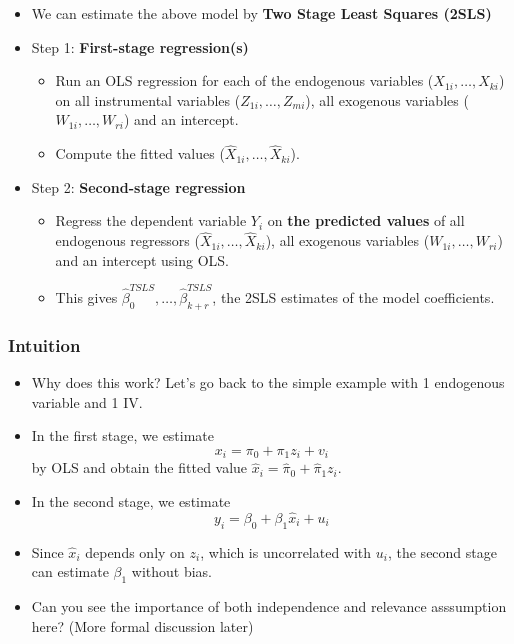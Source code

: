 \documentclass[]{book}
\providecommand{\tightlist}{%
  \setlength{\itemsep}{0pt}\setlength{\parskip}{0pt}}
\begin{document}
\begin{itemize}
\tightlist
\item
  We can estimate the above model by \textbf{Two Stage Least Squares
  (2SLS)}
\item
  Step 1: \textbf{First-stage regression(s)}

  \begin{itemize}
  \tightlist
  \item
    Run an OLS regression for each of the endogenous variables
    (\(X_{1i},\dots,X_{ki}\)) on all instrumental variables
    (\(Z_{1i},\dots,Z_{mi}\)), all exogenous variables
    (\(W_{1i},\dots,W_{ri}\)) and an intercept.
  \item
    Compute the fitted values
    (\(\widehat{X}_{1i},\dots,\widehat{X}_{ki}\)).
  \end{itemize}
\item
  Step 2: \textbf{Second-stage regression}

  \begin{itemize}
  \tightlist
  \item
    Regress the dependent variable \(Y_i\) on \textbf{the predicted
    values} of all endogenous regressors
    (\(\widehat{X}_{1i},\dots,\widehat{X}_{ki}\)), all exogenous
    variables (\(W_{1i},\dots,W_{ri}\)) and an intercept using OLS.
  \item
    This gives
    \(\widehat{\beta}_{0}^{TSLS},\dots,\widehat{\beta}_{k+r}^{TSLS}\),
    the 2SLS estimates of the model coefficients.
  \end{itemize}
\end{itemize}

\subsubsection{Intuition}\label{intuition}

\begin{itemize}
\tightlist
\item
  Why does this work? Let's go back to the simple example with 1
  endogenous variable and 1 IV.
\item
  In the first stage, we estimate\\
  \[
  x_i = \pi_0 + \pi_1 z_i + v_i
  \] by OLS and obtain the fitted value
  \(\widehat{x}_i = \widehat{\pi}_0 + \widehat{\pi}_1 z_i\).
\item
  In the second stage, we estimate \[
  y_i = \beta_0 + \beta_1 \widehat{x}_i + u_i
  \]
\item
  Since \(\widehat{x}_i\) depends only on \(z_i\), which is uncorrelated
  with \(u_i\), the second stage can estimate \(\beta_1\) without bias.
\item
  Can you see the importance of both independence and relevance
  asssumption here? (More formal discussion later)
\end{itemize}
\end{document}
